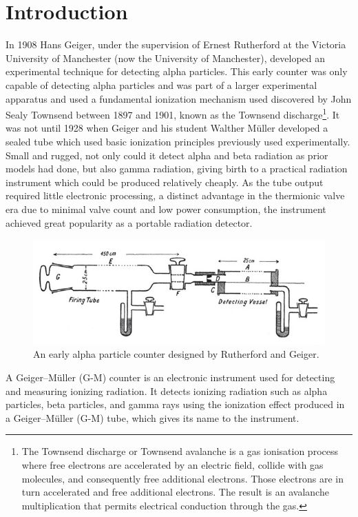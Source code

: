 \documentclass[%
 reprint,
nofootinbib,
 amsmath,amssymb,
 aps,
floatfix,
]{revtex4-2}
\begin{document}
\section{\label{sec:level1}Introduction}
    In 1908 Hans Geiger, under the supervision of Ernest Rutherford at the Victoria University of Manchester (now the University of Manchester), developed an experimental technique for detecting alpha particles. This early counter was only capable of detecting alpha particles and was part of a larger experimental apparatus and used a fundamental ionization mechanism used discovered by John Sealy Townsend between 1897 and 1901, known as the Townsend discharge\footnote{The Townsend discharge or Townsend avalanche is a gas ionisation process where free electrons are accelerated by an electric field, collide with gas molecules, and consequently free additional electrons. Those electrons are in turn accelerated and free additional electrons. The result is an avalanche multiplication that permits electrical conduction through the gas.}. It was not until 1928 when Geiger and his student Walther M\"{u}ller developed a sealed tube which used basic ionization principles previously used experimentally. Small and rugged, not only could it detect alpha and beta radiation as prior models had done, but also gamma radiation, giving birth to a practical radiation instrument which could be produced relatively cheaply. As the tube output required little electronic processing, a distinct advantage in the thermionic valve era due to minimal valve count and low power consumption, the instrument achieved great popularity as a portable radiation detector.
    \begin{figure}
        \centering
        \includegraphics[scale = 0.35]{Figures/PSM_V87_D120_Apparatus_for_counting_alpha_particles.png}
        \caption{An early alpha particle counter designed by Rutherford and Geiger.}
        \label{fig:ruthercount}
    \end{figure}
    \par
    A Geiger–M\"{u}ller (G-M) counter is an electronic instrument used for detecting and measuring ionizing radiation. It detects ionizing radiation such as alpha particles, beta particles, and gamma rays using the ionization effect produced in a Geiger–M\"{u}ller (G-M) tube, which gives its name to the instrument.
\end{document}
